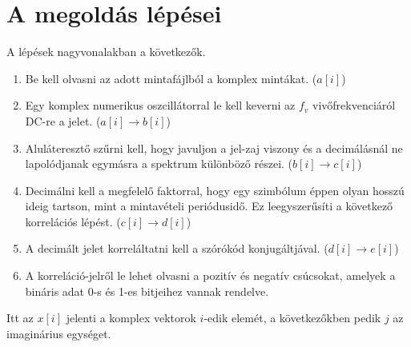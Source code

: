 \section{A megoldás lépései}
	A lépések nagyvonalakban a következők.
	\begin{enumerate}
		\item Be kell olvasni az adott mintafájlból a komplex mintákat. ($a[i]$)
		\item Egy komplex numerikus oszcillátorral le kell keverni az $f_v$ vivőfrekvenciáról DC-re a jelet. ($a[i] \rightarrow b[i]$)
		\item Aluláteresztő szűrni kell, hogy javuljon a jel-zaj viszony és a decimálásnál ne lapolódjanak egymásra a spektrum különböző részei. ($b[i] \rightarrow c[i]$)
		\item Decimálni kell a megfelelő faktorral, hogy egy szimbólum éppen olyan hosszú ideig tartson, mint a mintavételi periódusidő. Ez leegyszerűsíti a következő korrelációs lépést. ($c[i] \rightarrow d[i]$)
		\item A decimált jelet korreláltatni kell a szórókód konjugáltjával. ($d[i] \rightarrow e[i]$)
		\item A korreláció-jelről le lehet olvasni a pozitív és negatív csúcsokat, amelyek a bináris adat 0-s és 1-es bitjeihez vannak rendelve.
	\end{enumerate}
	Itt az $x[i]$ jelenti a komplex vektorok $i$-edik elemét, a következőkben pedik $j$ az imaginárius egységet.
